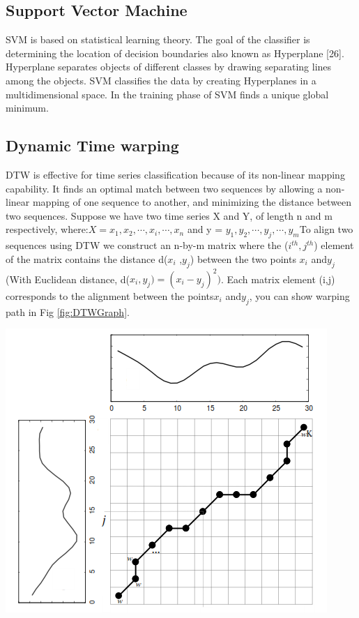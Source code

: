 \documentclass[twoside]{article}
\begin{document}
\begin{multicols}{2}
\subsection*{Support Vector Machine}
SVM is based on statistical learning theory. The goal of the classifier is determining the location of decision boundaries also known as Hyperplane [26]. Hyperplane separates objects of different classes by drawing separating lines among the objects. SVM classifies the data by creating Hyperplanes in a multidimensional space. In the training phase of SVM finds a unique global minimum.

\subsection*{Dynamic Time warping}
DTW is effective for time series classification because of its non-linear mapping capability. It finds an optimal match between two sequences by allowing a non-linear mapping of one sequence to another, and minimizing the distance between two sequences.
Suppose we have two time series X and Y, of length n and m respectively, where:$ X= x_1 ,x_2 ,\cdots,x_i ,\cdots,x_n$  and  y = $y_1 ,y_2 ,\cdots,y_j ,\cdots,y_m $To align two sequences using DTW we construct an n-by-m matrix where the ($i^{th} , j^{th} $) element of the matrix contains the distance d($x_i$ ,$y_j$) between the two points $x_i $ and$y_j $ (With Euclidean distance, d($x_i ,y_j ) = (x_i - y_j )^ 2 )$. Each matrix element (i,j) corresponds to the alignment between the points$ x_i $ and$ y_j$, you can show warping path in Fig \ref{fig:DTWGraph}.


	\includegraphics[scale=0.5]{../Figures/DTWGraph.png}
	\label{fig:DTWGraph}



\end{multicols}
\end{document}
